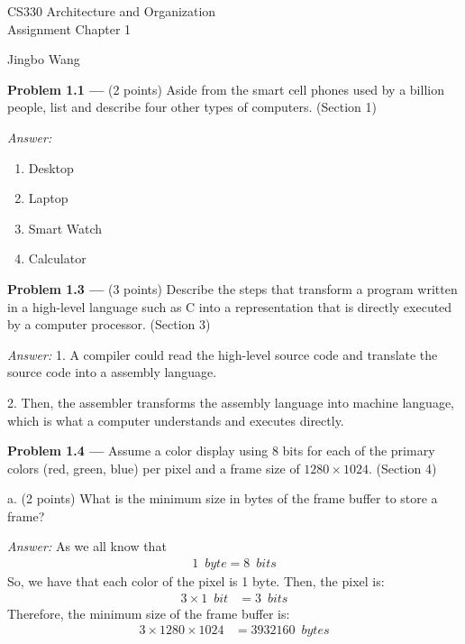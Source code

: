 \documentclass[11pt]{article}
\newcommand{\problem}[1]{\textbf{Problem #1 ---} }
\newcommand{\answer}{{\color{red}\textit{Answer: }}}
\begin{document}
\thispagestyle{empty}

\begin{center}
{\large CS330 Architecture and Organization}\\
Assignment Chapter 1
\end{center}

\begin{flushright}
Jingbo Wang
\end{flushright}

\problem{1.1}(2 points) Aside from the smart cell phones used by a billion people, list and describe four other types of computers. (Section 1)

\answer 
\begin{enumerate}
    \item Desktop
    \item Laptop
    \item Smart Watch
    \item Calculator
\end{enumerate}

\problem{1.3}(3 points) Describe the steps that transform a program written in a high-level language such as C into a representation that is directly executed by a computer processor. (Section 3)

\answer
1. A compiler could read the high-level source code and translate the source code into a assembly language.

2. Then, the assembler transforms the assembly language into machine language, which is what a computer understands and executes directly.

\problem{1.4} Assume a color display using 8 bits for each of the primary colors (red, green, blue) per pixel and a frame size of $1280 \times 1024$. (Section 4)

a. (2 points) What is the minimum size in bytes of the frame buffer to store a frame?

\answer
As we all know that 
\begin{align*}
    1 \enspace byte = 8 \enspace bits
\end{align*}
So, we have that each color of the pixel is 1 byte. Then, the pixel is:
\begin{align*}
    3 \times 1 \enspace bit &= 3 \enspace bits
\end{align*}
Therefore, the minimum size of the frame buffer is:
\begin{align*}
    3 \times 1280 \times 1024 &= 3932160 \enspace bytes
\end{align*}
\end{document}
